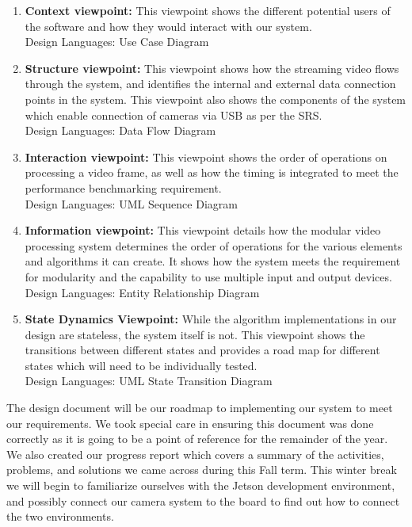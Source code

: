 \begin{enumerate}[leftmargin=2cm,labelindent=2cm]
\item \textbf{Context viewpoint:}
This viewpoint shows the different potential users of the software and how they would
interact with our system.\\
Design Languages: Use Case Diagram
\item \textbf{Structure viewpoint:}
This viewpoint shows how the streaming video flows through the system, and identifies the
internal and external data connection points in the system. This viewpoint also shows the
components of the system which enable connection of cameras via USB as per the SRS.\\
Design Languages: Data Flow Diagram
\item \textbf{Interaction viewpoint:}
This viewpoint shows the order of operations on processing a video frame, as well as how
the timing is integrated to meet the performance benchmarking requirement.\\
Design Languages: UML Sequence Diagram
\item \textbf{Information viewpoint:}
This viewpoint details how the modular video processing system determines the order of
operations for the various elements and algorithms it can create. It shows how the system
meets the requirement for modularity and the capability to use multiple input and output
devices.\\
Design Languages: Entity Relationship Diagram
\item \textbf{State Dynamics Viewpoint:}
While the algorithm implementations in our design are stateless, the system itself is not.
This viewpoint shows the transitions between different states and provides a road map for
different states which will need to be individually tested.\\
Design Languages: UML State Transition Diagram
\end{enumerate}
The design document will be our roadmap to implementing our system to meet our requirements. We took special care in ensuring this document was done correctly as it is going to be a point of reference for the remainder of the year. We also created our progress report which covers a summary of the activities, problems, and solutions we came across during this Fall term. This winter break we will begin to familiarize ourselves with the Jetson development environment, and possibly connect our camera system to the board to find out how to connect the two environments.